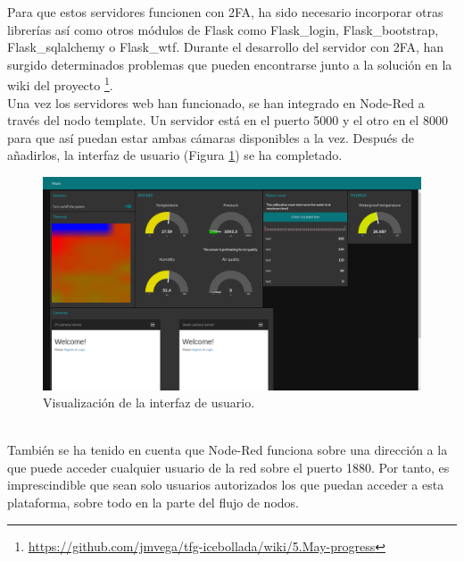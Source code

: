 Para que estos servidores funcionen con 2FA, ha sido necesario incorporar otras librerías así como otros módulos de Flask como Flask\_login, Flask\_bootstrap, Flask\_sqlalchemy o Flask\_wtf. Durante el desarrollo del servidor con 2FA, han surgido determinados problemas que pueden encontrarse junto a la solución en la wiki del proyecto \footnote{\url{https://github.com/jmvega/tfg-icebollada/wiki/5.May-progress}}.\\

Una vez los servidores web han funcionado, se han integrado en Node-Red a través del nodo template. Un servidor está en el puerto 5000 y el otro en el 8000 para que así puedan estar ambas cámaras disponibles a la vez. Después de añadirlos, la interfaz de usuario (Figura \ref{fig:UIcompleta}) se ha completado.
\begin{figure} [h!]
  \begin{center}
    \includegraphics[width=16cm]{figs/UIcompleta}
  \end{center}
  \caption{Visualización de la interfaz de usuario.}
  \label{fig:UIcompleta}
\end{figure}\\

También se ha tenido en cuenta que Node-Red funciona sobre una dirección a la que puede acceder cualquier usuario de la red sobre el puerto 1880. Por tanto, es imprescindible que sean solo usuarios autorizados los que puedan acceder a esta plataforma, sobre todo en la parte del flujo de nodos. 

